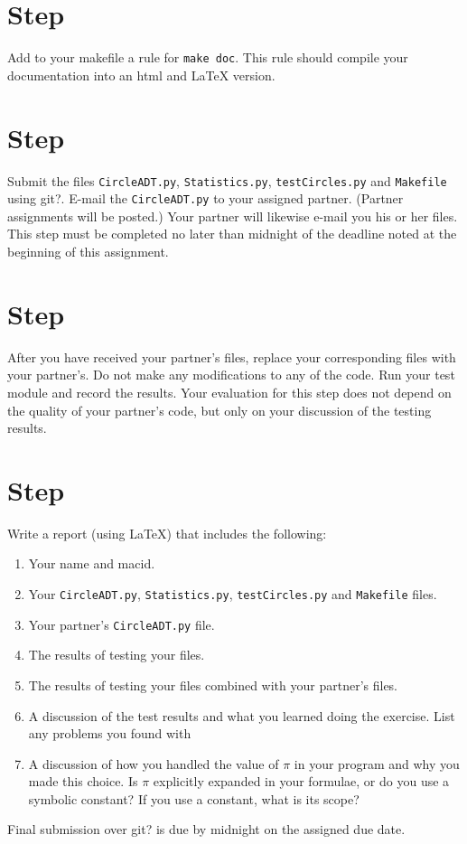 \documentclass[12pt]{article}
\newcounter{stepnum}
\begin{document}
\section *{Step  \thestepnum}
Add to your makefile a rule for {\tt make doc}.  This rule should compile your
documentation into an html and LaTeX version.
\section *{Step  \thestepnum}
Submit the files {\tt CircleADT.py}, {\tt Statistics.py}, {\tt testCircles.py}
and {\tt Makefile} using git?.  E-mail the {\tt CircleADT.py} to your assigned
partner.  (Partner assignments will be posted.)  Your partner will
likewise e-mail you his or her files.  This step must be completed no later than
midnight of the deadline noted at the beginning of this assignment.
\section *{Step  \thestepnum}
After you have received your partner's files, replace your corresponding files
with your partner's.  Do not make any modifications to any of the code.  Run
your test module and record the results.  Your evaluation for this step does not
depend on the quality of your partner's code, but only on your discussion of the
testing results.
\section *{Step  \thestepnum}
Write a report (using LaTeX) that includes the following:
\begin{enumerate}
\item Your name and macid.
\item Your {\tt CircleADT.py}, {\tt Statistics.py}, {\tt testCircles.py} and {\tt Makefile} files.
\item Your partner's {\tt CircleADT.py} file.
\item The results of testing your files.
\item The results of testing your files combined with your partner's files.
\item A discussion of the test results and what you learned doing the exercise.
  List any problems you found with
\item A discussion of how you handled the value of $\pi$ in your program and why
  you made this choice.  Is $\pi$ explicitly expanded in your formulae, or do
  you use a symbolic constant?  If you use a constant, what is its scope?
\end{enumerate}
Final submission over git? is due by midnight on the assigned due date.
\end{document}
